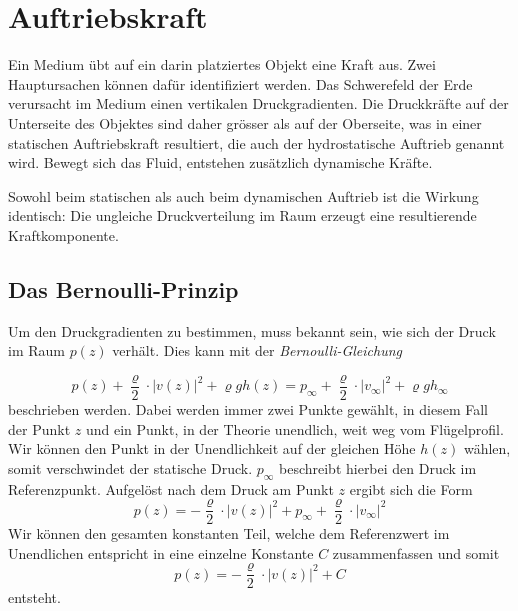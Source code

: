 \section{Auftriebskraft}
	Ein Medium übt auf ein darin platziertes Objekt eine Kraft aus.
	Zwei Hauptursachen können dafür identifiziert werden.
	Das Schwerefeld der Erde verursacht im Medium einen vertikalen Druckgradienten.
%
%
	Die Druckkräfte auf der Unterseite des Objektes sind daher grösser als auf der Oberseite,
	was in einer statischen Auftriebskraft resultiert, die auch der hydrostatische Auftrieb genannt wird. Bewegt sich das Fluid, entstehen zusätzlich dynamische Kräfte. 
%

	Sowohl beim statischen als auch beim dynamischen Auftrieb ist die Wirkung identisch: Die ungleiche Druckverteilung im Raum erzeugt eine resultierende Kraftkomponente.

\subsection{Das Bernoulli-Prinzip}
%
	Um den Druckgradienten zu bestimmen, muss bekannt sein, wie sich der Druck im Raum $p(z)$ verhält. Dies kann mit der \emph{Bernoulli-Gleichung}
%
	
	\[
		p(z) + \frac{\varrho}{2} \cdot |v(z)|^2 + \varrho g h(z) 
		=
		p_{\infty} + \frac{\varrho}{2} \cdot |v_{\infty}|^2 + \varrho g h_{\infty}
	\]
	beschrieben werden.
	Dabei werden immer zwei Punkte gewählt, in diesem Fall der Punkt $z$ und ein Punkt, in der Theorie unendlich, weit weg vom Flügelprofil. Wir können den Punkt in der Unendlichkeit auf der gleichen Höhe $h(z)$ wählen, somit verschwindet der statische Druck. $p_\infty$ beschreibt hierbei den Druck im Referenzpunkt. Aufgelöst nach dem Druck am Punkt $z$ ergibt sich die Form
	\[
		p(z)
		=
		-\frac{\varrho}{2} \cdot |v(z)|^2
		+
		p_{\infty}
		+
		\frac{\varrho}{2} \cdot |v_{\infty}|^2		
	\]
	Wir können den gesamten konstanten Teil,
	welche dem Referenzwert im Unendlichen entspricht in eine einzelne Konstante $C$ zusammenfassen
	und somit
	\[
		p(z)
		= 
		-\frac{\varrho}{2} \cdot |v(z)|^2 + C
	\]
	entsteht.


